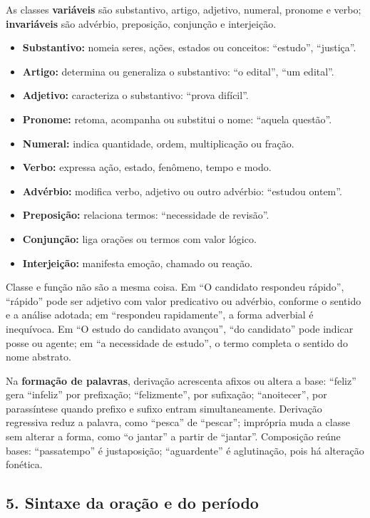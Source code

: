 \documentclass[11pt,a4paper]{article}
\begin{document}
As classes \textbf{variáveis} são substantivo, artigo, adjetivo, numeral, pronome e verbo; \textbf{invariáveis} são advérbio, preposição, conjunção e interjeição.

\begin{itemize}
  \item \textbf{Substantivo:} nomeia seres, ações, estados ou conceitos: “estudo”, “justiça”.
  \item \textbf{Artigo:} determina ou generaliza o substantivo: “o edital”, “um edital”.
  \item \textbf{Adjetivo:} caracteriza o substantivo: “prova difícil”.
  \item \textbf{Pronome:} retoma, acompanha ou substitui o nome: “aquela questão”.
  \item \textbf{Numeral:} indica quantidade, ordem, multiplicação ou fração.
  \item \textbf{Verbo:} expressa ação, estado, fenômeno, tempo e modo.
  \item \textbf{Advérbio:} modifica verbo, adjetivo ou outro advérbio: “estudou ontem”.
  \item \textbf{Preposição:} relaciona termos: “necessidade de revisão”.
  \item \textbf{Conjunção:} liga orações ou termos com valor lógico.
  \item \textbf{Interjeição:} manifesta emoção, chamado ou reação.
\end{itemize}

Classe e função não são a mesma coisa. Em “O candidato respondeu rápido”, “rápido” pode ser adjetivo com valor predicativo ou advérbio, conforme o sentido e a análise adotada; em “respondeu rapidamente”, a forma adverbial é inequívoca. Em “O estudo do candidato avançou”, “do candidato” pode indicar posse ou agente; em “a necessidade de estudo”, o termo completa o sentido do nome abstrato.

Na \textbf{formação de palavras}, derivação acrescenta afixos ou altera a base: “feliz” gera “infeliz” por prefixação; “felizmente”, por sufixação; “anoitecer”, por parassíntese quando prefixo e sufixo entram simultaneamente. Derivação regressiva reduz a palavra, como “pesca” de “pescar”; imprópria muda a classe sem alterar a forma, como “o jantar” a partir de “jantar”. Composição reúne bases: “passatempo” é justaposição; “aguardente” é aglutinação, pois há alteração fonética.

\subsection*{5. Sintaxe da oração e do período}
\end{document}
